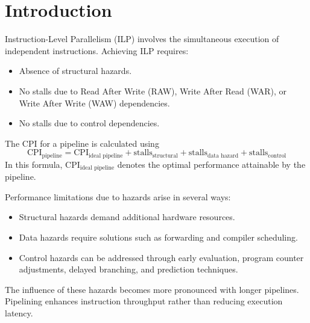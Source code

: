 \section{Introduction}

Instruction-Level Parallelism (ILP) involves the simultaneous execution of independent instructions. 
Achieving ILP requires:
\begin{itemize}
    \item Absence of structural hazards.
    \item No stalls due to Read After Write (RAW), Write After Read (WAR), or Write After Write (WAW) dependencies.
    \item No stalls due to control dependencies.
\end{itemize}

The CPI for a pipeline is calculated using
\[\text{CPI}_{\text{pipeline}}=\text{CPI}_{\text{ideal pipeline}} + \text{stalls}_{\text{structural}} + \text{stalls}_{\text{data hazard}} + \text{stalls}_{\text{control}}\]
In this formula, $\text{CPI}_{\text{ideal pipeline}}$ denotes the optimal performance attainable by the pipeline.

Performance limitations due to hazards arise in several ways:
\begin{itemize}
    \item Structural hazards demand additional hardware resources.
    \item Data hazards require solutions such as forwarding and compiler scheduling.
    \item Control hazards can be addressed through early evaluation, program counter adjustments, delayed branching, and prediction techniques.
\end{itemize}
The influence of these hazards becomes more pronounced with longer pipelines.
Pipelining enhances instruction throughput rather than reducing execution latency.